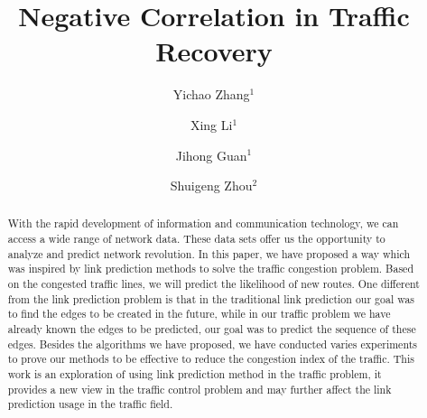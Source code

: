\documentclass[onecolumn,preprintnumbers,amsmath,amssymb]{revtex4}
\begin{document}
\title{Negative Correlation in Traffic Recovery}

\author{Yichao Zhang$^{1}$}

\author{Xing Li$^{1}$}


\author{Jihong Guan$^{1}$}


\author{Shuigeng Zhou$^{2}$}



\begin{abstract}
With the rapid development of information and communication technology, we can access a wide range of network data. These data sets offer us the opportunity to analyze and predict network revolution. In this paper, we have proposed a way which was inspired by link prediction methods to solve the traffic congestion problem. Based on the congested traffic lines, we will predict the likelihood of new routes. One different from the link prediction problem is that in the traditional link prediction our goal was to find the edges to be created in the future, while in our traffic problem we have already known the edges to be predicted, our goal was to predict the sequence of these edges. Besides the algorithms we have proposed, we have conducted varies experiments to prove our methods to be effective to reduce the congestion index of the traffic. This work is an exploration of using link prediction method in the traffic problem, it provides a new view in the traffic control problem and may further affect the link prediction usage in the traffic field. 
\end{abstract}


\maketitle
\end{document}
